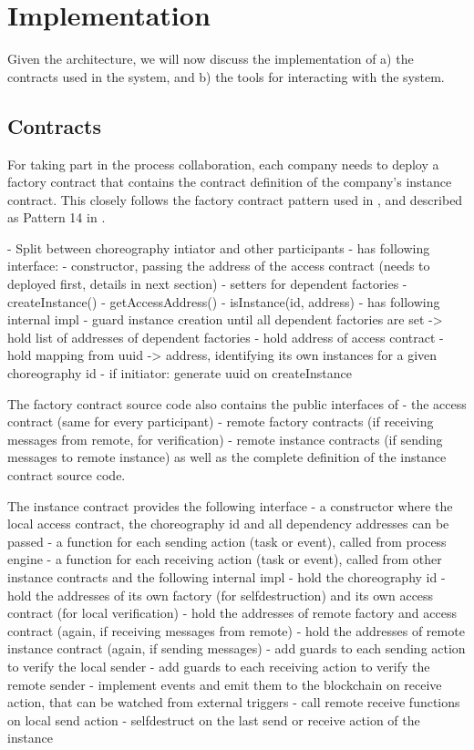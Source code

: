\documentclass[runningheads]{llncs}
\begin{document}
\section{Implementation}

Given the architecture, we will now discuss the implementation of a) the contracts used in the system, and b) the tools for interacting with the system.

\subsection{Contracts}

For taking part in the process collaboration, each company needs to deploy a factory contract that contains the contract definition of the company's instance contract.
This closely follows the factory contract pattern used in \cite{weber2016untrusted}, and described as Pattern 14 in \cite{xu2018pattern}.

- Split between choreography intiator and other participants
- has following interface:
  - constructor, passing the address of the access contract (needs to deployed first, details in next section)
  - setters for dependent factories
  - createInstance()
  - getAccessAddress()
  - isInstance(id, address)
- has following internal impl
  - guard instance creation until all dependent factories are set
  -> hold list of addresses of dependent factories
  - hold address of access contract
  - hold mapping from uuid -> address, identifying its own instances for a given choreography id
  - if initiator: generate uuid on createInstance

The factory contract source code also contains the public interfaces of
  - the access contract (same for every participant)
  - remote factory contracts (if receiving messages from remote, for verification)
  - remote instance contracts (if sending messages to remote instance)
as well as the complete definition of the instance contract source code.

The instance contract provides the following interface
  - a constructor where the local access contract, the choreography id and all dependency addresses can be passed
  - a function for each sending action (task or event), called from process engine
  - a function for each receiving action (task or event), called from other instance contracts
and the following internal impl
  - hold the choreography id
  - hold the addresses of its own factory (for selfdestruction) and its own access contract (for local verification)
  - hold the addresses of remote factory and access contract (again, if receiving messages from remote)
  - hold the addresses of remote instance contract (again, if sending messages)
  - add guards to each sending action to verify the local sender
  - add guards to each receiving action to verify the remote sender
  - implement events and emit them to the blockchain on receive action, that can be watched from external triggers
  - call remote receive functions on local send action
  - selfdestruct on the last send or receive action of the instance
\end{document}
